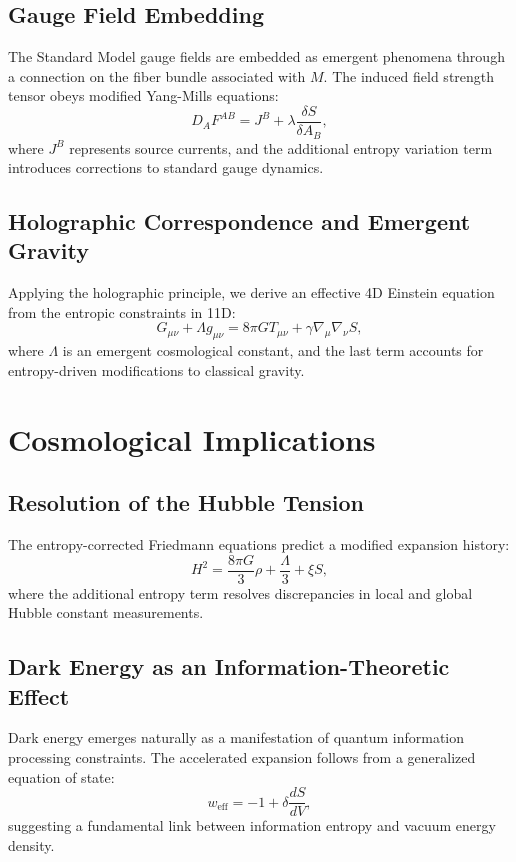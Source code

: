 \documentclass[12pt]{article}
\begin{document}
\subsection{Gauge Field Embedding}
The Standard Model gauge fields are embedded as emergent phenomena through a connection on the fiber bundle associated with $M$. The induced field strength tensor obeys modified Yang-Mills equations:
\begin{equation}
D_A F^{AB} = J^B + \lambda \frac{\delta S}{\delta A_B},
\end{equation}
where $J^B$ represents source currents, and the additional entropy variation term introduces corrections to standard gauge dynamics.

\subsection{Holographic Correspondence and Emergent Gravity}
Applying the holographic principle, we derive an effective 4D Einstein equation from the entropic constraints in 11D:
\begin{equation}
G_{\mu\nu} + \Lambda g_{\mu\nu} = 8\pi G T_{\mu\nu} + \gamma \nabla_\mu \nabla_\nu S,
\end{equation}
where $\Lambda$ is an emergent cosmological constant, and the last term accounts for entropy-driven modifications to classical gravity.

\section{Cosmological Implications}
\subsection{Resolution of the Hubble Tension}
The entropy-corrected Friedmann equations predict a modified expansion history:
\begin{equation}
H^2 = \frac{8\pi G}{3} \rho + \frac{\Lambda}{3} + \xi S,
\end{equation}
where the additional entropy term resolves discrepancies in local and global Hubble constant measurements.

\subsection{Dark Energy as an Information-Theoretic Effect}
Dark energy emerges naturally as a manifestation of quantum information processing constraints. The accelerated expansion follows from a generalized equation of state:
\begin{equation}
w_{\text{eff}} = -1 + \delta \frac{dS}{dV},
\end{equation}
suggesting a fundamental link between information entropy and vacuum energy density.
\end{document}
